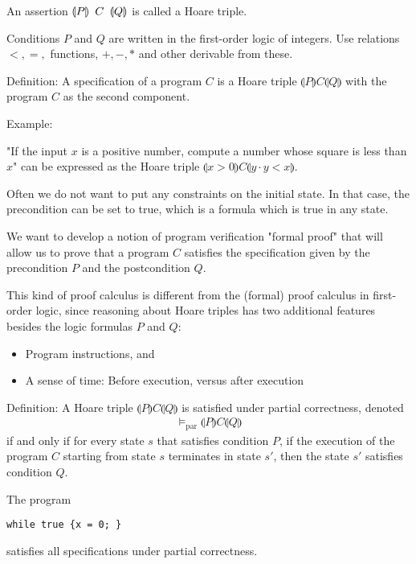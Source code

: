 \documentclass{article}
\begin{document}
An assertion $\llparenthesis P \rrparenthesis \hspace{0.5em} C \hspace{0.5em} \llparenthesis Q \rrparenthesis$ is called a Hoare triple.

Conditions $P$ and $Q$ are written in the first-order logic of integers. Use relations $<, =, $ functions, $+, - , *$ and other derivable from these.

Definition: A specification of a program $C$ is a Hoare triple $\llparenthesis P \rrparenthesis C \llparenthesis Q \rrparenthesis$ with the program $C$ as the second component.

Example:

"If the input $x$ is a positive number, compute a number whose square is less than $x$" can be expressed as the Hoare triple $\llparenthesis x > 0 \rrparenthesis C \llparenthesis y \cdot y < x \rrparenthesis$.

Often we do not want to put any constraints on the initial state. In that case, the precondition can be set to true, which is a formula which is true in any state.

We want to develop a notion of program verification "formal proof" that will allow us to prove that a program $C$ satisfies the specification given by the precondition $P$ and the postcondition $Q$.

This kind of proof calculus is different from the (formal) proof calculus in first-order logic, since reasoning about Hoare triples has two additional features besides the logic formulas $P$ and $Q$:
\begin{itemize}
    \item  Program instructions, and
    \item A sense of time: Before execution, versus after execution
\end{itemize}


Definition: A Hoare triple $\llparenthesis P \rrparenthesis C \llparenthesis Q \rrparenthesis$ is satisfied under partial correctness, denoted
\begin{align*}
\vDash_{\text{par}} \llparenthesis P \rrparenthesis C \llparenthesis Q \rrparenthesis
\end{align*}
if and only if for every state $s$ that satisfies condition $P$, if the execution of the program $C$ starting from state $s$ terminates in state $s'$, then the state $s'$ satisfies condition $Q$.

The program 
\begin{verbatim}
while true {x = 0; }
\end{verbatim}
satisfies all specifications under partial correctness. 
\end{document}

